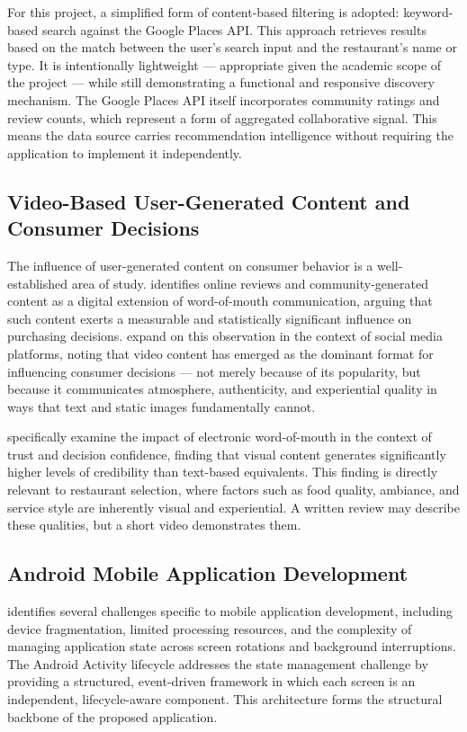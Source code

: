 \documentclass[12pt, a4paper]{article}
\begin{document}
For this project, a simplified form of content-based filtering is adopted: keyword-based search against the Google Places API. This approach retrieves results based on the match between the user's search input and the restaurant's name or type. It is intentionally lightweight — appropriate given the academic scope of the project — while still demonstrating a functional and responsive discovery mechanism. The Google Places API itself incorporates community ratings and review counts, which represent a form of aggregated collaborative signal. This means the data source carries recommendation intelligence without requiring the application to implement it independently.

\subsection{Video-Based User-Generated Content and Consumer Decisions}

The influence of user-generated content on consumer behavior is a well-established area of study. \citet{dellarocas2003} identifies online reviews and community-generated content as a digital extension of word-of-mouth communication, arguing that such content exerts a measurable and statistically significant influence on purchasing decisions. \citet{kaplan2010} expand on this observation in the context of social media platforms, noting that video content has emerged as the dominant format for influencing consumer decisions — not merely because of its popularity, but because it communicates atmosphere, authenticity, and experiential quality in ways that text and static images fundamentally cannot.

\citet{cheung2009} specifically examine the impact of electronic word-of-mouth in the context of trust and decision confidence, finding that visual content generates significantly higher levels of credibility than text-based equivalents. This finding is directly relevant to restaurant selection, where factors such as food quality, ambiance, and service style are inherently visual and experiential. A written review may describe these qualities, but a short video demonstrates them.

\subsection{Android Mobile Application Development}

\citet{wasserman2010} identifies several challenges specific to mobile application development, including device fragmentation, limited processing resources, and the complexity of managing application state across screen rotations and background interruptions. The Android Activity lifecycle addresses the state management challenge by providing a structured, event-driven framework in which each screen is an independent, lifecycle-aware component. This architecture forms the structural backbone of the proposed application.
\end{document}
